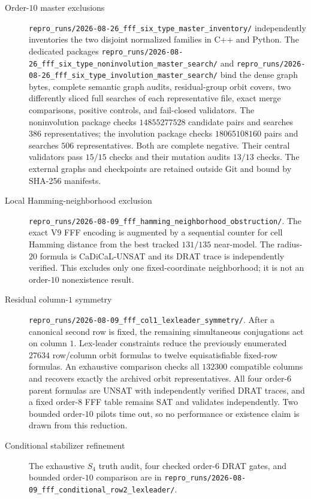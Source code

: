 \begin{description}
\item[Order-$10$ master exclusions]
\nolinkurl{repro_runs/2026-08-26_fff_six_type_master_inventory/}
independently inventories the two disjoint normalized families in C++ and
Python.  The dedicated packages
\nolinkurl{repro_runs/2026-08-26_fff_six_type_noninvolution_master_search/}
and
\nolinkurl{repro_runs/2026-08-26_fff_six_type_involution_master_search/}
bind the dense graph bytes, complete semantic graph audits, residual-group
orbit covers, two differently sliced full searches of each representative
file, exact merge comparisons, positive controls, and fail-closed validators.
The noninvolution package checks $14855277528$ candidate pairs and searches
$386$ representatives; the involution package checks $18065108160$ pairs and
searches $506$ representatives.  Both are complete negative.  Their central
validators pass $15/15$ checks and their mutation audits $13/13$ checks.  The
external graphs and checkpoints are retained outside Git and bound by SHA-256
manifests.

\item[Local Hamming-neighborhood exclusion]
\nolinkurl{repro_runs/2026-08-09_fff_hamming_neighborhood_obstruction/}.
The exact V9 FFF encoding is augmented by a sequential counter for cell
Hamming distance from the best tracked $131/135$ near-model.  The radius-$20$
formula is CaDiCaL-UNSAT and its DRAT trace is independently verified.  This
excludes only one fixed-coordinate neighborhood; it is not an order-$10$
nonexistence result.

\item[Residual column-$1$ symmetry]
\nolinkurl{repro_runs/2026-08-09_fff_col1_lexleader_symmetry/}.
After a canonical second row is fixed, the remaining simultaneous
conjugations act on column $1$.  Lex-leader constraints reduce the previously
enumerated $27634$ row/column orbit formulas to twelve equisatisfiable
fixed-row formulas.  An exhaustive comparison checks all $132300$ compatible
columns and recovers exactly the archived orbit representatives.  All four
order-$6$ parent formulas are UNSAT with independently verified DRAT traces,
and a fixed order-$8$ FFF table remains SAT and validates independently.  Two
bounded order-$10$ pilots time out, so no performance or existence claim is
drawn from this reduction.

\item[Conditional stabilizer refinement]
The exhaustive $S_4$ truth audit,
four checked order-$6$ DRAT gates, and bounded order-$10$ comparison are in
\nolinkurl{repro_runs/2026-08-09_fff_conditional_row2_lexleader/}.


\end{description}
